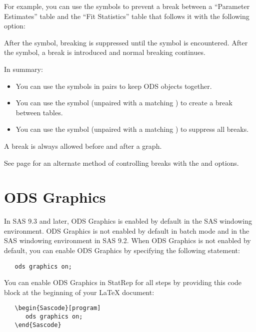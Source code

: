 \documentclass[article,oneside]{memoir}
\newcommand*{\StatRep}{\textsf{StatRep}\xspace}
\begin{document}
  For example, you can use the symbols to prevent a break between a
  ``Parameter Estimates'' table and the ``Fit Statistics'' table that follows it
  with the following option:

  After the \Code{<} symbol, breaking is suppressed until the \Code{>} symbol is encountered.
  After the \Code{>} symbol, a break is introduced and normal breaking continues.

  In summary:
  \begin{itemize}
  \item You can use the \Code{<>} symbols in pairs to keep ODS objects together.
  \item You can use the \Code{>} symbol (unpaired with a matching \Code{<}) to create a break between tables.
  \item You can use the \Code{<} symbol (unpaired with a matching \Code{>}) to suppress all breaks.
  \end{itemize}

  A break is always allowed before and after a graph.

  See page \pageref{skiplast} for an alternate method of controlling breaks
  with the  and  options.

 \section{ODS Graphics}

 In SAS 9.3 and later, ODS Graphics is enabled by default in the SAS windowing environment.
 ODS Graphics is not enabled by default in batch mode and in the SAS windowing environment in SAS 9.2.
 When ODS Graphics is not enabled by default, you can enable ODS Graphics by specifying the following statement:

\begin{snugshade}
\begin{verbatim}
   ods graphics on;
\end{verbatim}
\end{snugshade}


You can enable ODS Graphics in \StatRep for all steps by providing this code block at the
beginning of your LaTeX document:

\begin{snugshade}
\begin{verbatim}
   \begin{Sascode}[program]
      ods graphics on;
   \end{Sascode}
\end{verbatim}
\end{snugshade}
\end{document}
